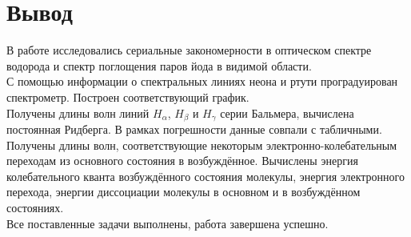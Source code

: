 \documentclass[a4paper, 12pt]{article}
\begin{document}
\section*{Вывод}
В работе исследовались сериальные закономерности в оптическом спектре водорода и спектр поглощения паров йода в видимой области.\\
С помощью информации о спектральных линиях неона и ртути проградуирован спектрометр. Построен соответствующий график.\\
Получены длины волн линий $H_{\alpha}$, $H_{\beta}$ и $H_{\gamma}$ серии Бальмера, вычислена постоянная Ридберга. В рамках погрешности данные совпали с табличными.\\
Получены длины волн, соответствующие некоторым электронно-колебательным переходам из основного состояния в возбуждённое. Вычислены энергия колебательного кванта возбуждённого состояния молекулы, энергия электронного перехода, энергии диссоциации молекулы в основном и в возбуждённом состояниях.\\
Все поставленные задачи выполнены, работа завершена успешно.
\end{document}
